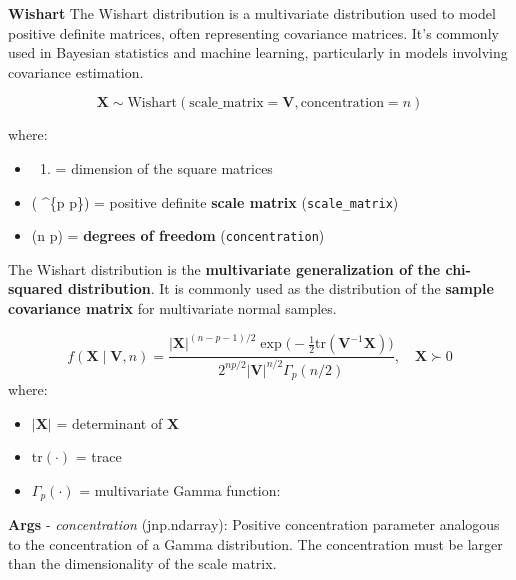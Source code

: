 \documentclass[
  letterpaper,
  DIV=11,
  numbers=noendperiod]{scrartcl}
\providecommand{\tightlist}{%
  \setlength{\itemsep}{0pt}\setlength{\parskip}{0pt}}\usepackage{longtable,booktabs,array}
\begin{document}
\textbf{Wishart} The Wishart distribution is a multivariate distribution
used to model positive definite matrices, often representing covariance
matrices. It's commonly used in Bayesian statistics and machine
learning, particularly in models involving covariance estimation.

\[
  \mathbf{X} \sim \text{Wishart}(\text{scale_matrix}=\mathbf{V}, \text{concentration}=n)
  \]

where:

\begin{itemize}
\tightlist
\item
  \begin{enumerate}
  \def\labelenumi{(\alph{enumi})}
  \setcounter{enumi}{15}
  \tightlist
  \item
    = dimension of the square matrices
  \end{enumerate}
\item
  ( \in {}\^{}\{p \times p\}) = positive definite
  \textbf{scale matrix} (\texttt{scale\_matrix})
\item
  (n \ge p) = \textbf{degrees of freedom} (\texttt{concentration})
\end{itemize}

The Wishart distribution is the \textbf{multivariate generalization of
the chi-squared distribution}. It is commonly used as the distribution
of the \textbf{sample covariance matrix} for multivariate normal
samples.

\[
  f(\mathbf{X} \mid \mathbf{V}, n) =
  \frac{ |\mathbf{X}|^{(n-p-1)/2} \exp\big(-\frac{1}{2} \mathrm{tr}(\mathbf{V}^{-1} \mathbf{X}) \big) }
  { 2^{np/2} |\mathbf{V}|^{n/2} \Gamma_p(n/2) }, \quad \mathbf{X} \succ 0
  \] where:

\begin{itemize}
\tightlist
\item
  \(|\mathbf{X}|\) = determinant of \(\mathbf{X}\)
\item
  \(\mathrm{tr}(\cdot)\) = trace
\item
  \(\Gamma_p(\cdot)\) = multivariate Gamma function:
\end{itemize}

\textbf{Args} - \emph{concentration} (jnp.ndarray): Positive
concentration parameter analogous to the concentration of a Gamma
distribution. The concentration must be larger than the dimensionality
of the scale matrix.
\end{document}
